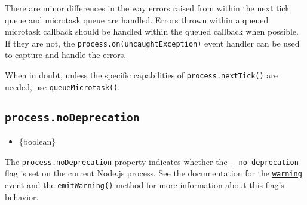 \begin{Shaded}
\begin{Highlighting}[]
 \OperatorTok{,}
  \NormalTok{(}\OperatorTok{,}\OperatorTok{+}\OperatorTok{;}
\NormalTok{\}}

\NormalTok{(}\NormalTok{)}\OperatorTok{;}
\NormalTok{(}\OperatorTok{,} \OperatorTok{,} \NormalTok{))}\OperatorTok{;}
\NormalTok{(}\NormalTok{)}\OperatorTok{;}
\end{Highlighting}
\end{Shaded}

There are minor differences in the way errors raised from within the
next tick queue and microtask queue are handled. Errors thrown within a
queued microtask callback should be handled within the queued callback
when possible. If they are not, the
\texttt{process.on(\textquotesingle{}uncaughtException\textquotesingle{})}
event handler can be used to capture and handle the errors.

When in doubt, unless the specific capabilities of
\texttt{process.nextTick()} are needed, use \texttt{queueMicrotask()}.

\subsection{\texorpdfstring{\texttt{process.noDeprecation}}{process.noDeprecation}}\label{process.nodeprecation}

\begin{itemize}
\tightlist
\item
  \{boolean\}
\end{itemize}

The \texttt{process.noDeprecation} property indicates whether the
\texttt{-\/-no-deprecation} flag is set on the current Node.js process.
See the documentation for the
\hyperref[event-warning]{\texttt{\textquotesingle{}warning\textquotesingle{}}
event} and the
\hyperref[processemitwarningwarning-type-code-ctor]{\texttt{emitWarning()}
method} for more information about this flag's behavior.

